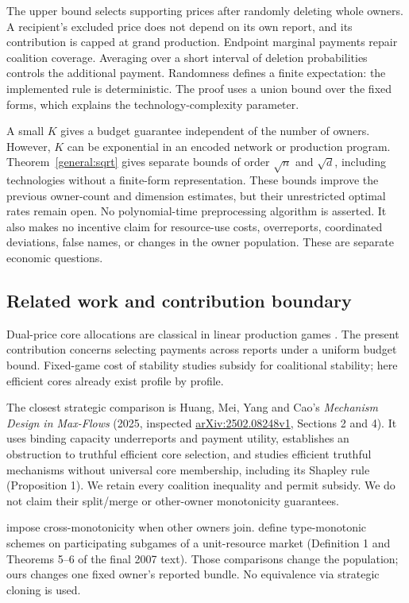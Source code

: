 \documentclass[11pt]{article}
\theoremstyle{definition}\newtheorem{definition}[theorem]{Definition}
\theoremstyle{remark}\newtheorem{remark}[theorem]{Remark}
\begin{document}
The upper bound selects supporting prices after randomly deleting whole
owners. A recipient's excluded price does not depend on its own report, and
its contribution is capped at grand production. Endpoint marginal payments
repair coalition coverage. Averaging over a short interval of deletion
probabilities controls the additional payment. Randomness defines a finite
expectation: the implemented rule is deterministic. The proof uses a union
bound over the fixed forms, which explains the technology-complexity parameter.

A small $K$ gives a budget guarantee independent of the number of owners.
However, $K$ can be exponential in an encoded network or production program.
Theorem~\ref{general:sqrt} gives separate bounds of order $\sqrt n$ and
$\sqrt d$, including technologies without a finite-form representation.
These bounds improve the previous owner-count and dimension estimates,
but their unrestricted optimal rates remain open. No polynomial-time
preprocessing algorithm is asserted. It also makes no incentive claim for resource-use
costs, overreports, coordinated deviations, false names, or changes in the
owner population. These are separate economic questions.

\subsection{Related work and contribution boundary}
Dual-price core allocations are classical in linear production games
\citep{Owen,SametZemel}. The present contribution concerns selecting payments
across reports under a uniform budget bound. Fixed-game cost of stability
\citep{Bachrach} studies subsidy for coalitional stability; here efficient
cores already exist profile by profile.

The closest strategic comparison is Huang, Mei, Yang and Cao's
\emph{Mechanism Design in Max-Flows} (2025, inspected
\href{https://arxiv.org/html/2502.08248v1}{arXiv:2502.08248v1}, Sections 2 and 4).
It uses binding capacity underreports and payment utility, establishes an
obstruction to truthful efficient core selection, and studies efficient
truthful mechanisms without universal core membership, including its Shapley
rule (Proposition 1). We retain every coalition
inequality and permit subsidy. We do not claim their split/merge or
other-owner monotonicity guarantees.

\citet{Immorlica} impose cross-monotonicity when other owners join.
\citet{Branzei} define type-monotonic schemes on participating subgames of a
unit-resource market (Definition 1 and Theorems 5--6 of the final 2007 text).
Those comparisons change the population; ours changes one fixed owner's
reported bundle. No equivalence via strategic cloning is used.
\end{document}

